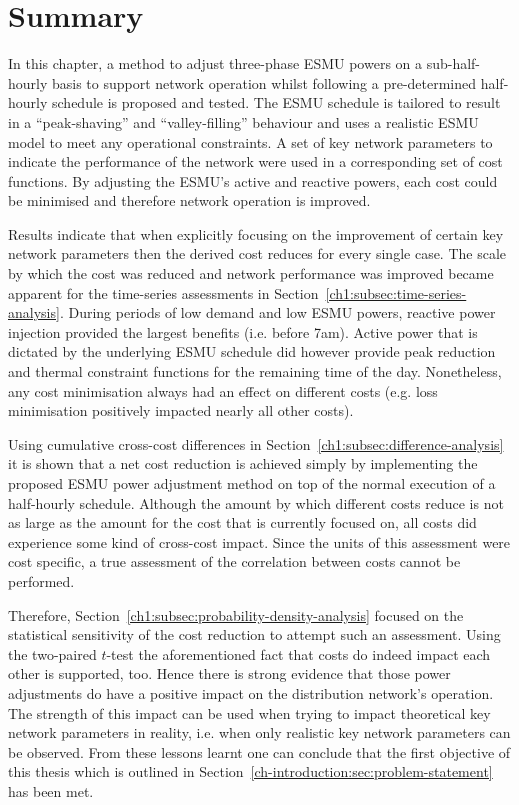 \section{Summary}
\label{ch1:sec:summary}

In this chapter, a method to adjust three-phase ESMU powers on a sub-half-hourly basis to support network operation whilst following a pre-determined half-hourly schedule is proposed and tested.
The ESMU schedule is tailored to result in a ``peak-shaving'' and ``valley-filling'' behaviour and uses a realistic ESMU model to meet any operational constraints.
A set of key network parameters to indicate the performance of the network were used in a corresponding set of cost functions.
By adjusting the ESMU's active and reactive powers, each cost could be minimised and therefore network operation is improved.

Results indicate that when explicitly focusing on the improvement of certain key network parameters then the derived cost reduces for every single case.
The scale by which the cost was reduced and network performance was improved became apparent for the time-series assessments in Section~\ref{ch1:subsec:time-series-analysis}.
During periods of low demand and low ESMU powers, reactive power injection provided the largest benefits (i.e. before 7am).
Active power that is dictated by the underlying ESMU schedule did however provide peak reduction and thermal constraint functions for the remaining time of the day.
Nonetheless, any cost minimisation always had an effect on different costs (e.g. loss minimisation positively impacted nearly all other costs).

Using cumulative cross-cost differences in Section~\ref{ch1:subsec:difference-analysis} it is shown that a net cost reduction is achieved simply by implementing the proposed ESMU power adjustment method on top of the normal execution of a half-hourly schedule.
Although the amount by which different costs reduce is not as large as the amount for the cost that is currently focused on, all costs did experience some kind of cross-cost impact.
Since the units of this assessment were cost specific, a true assessment of the correlation between costs cannot be performed.

Therefore, Section~\ref{ch1:subsec:probability-density-analysis} focused on the statistical sensitivity of the cost reduction to attempt such an assessment.
Using the two-paired $t$-test the aforementioned fact that costs do indeed impact each other is supported, too.
Hence there is strong evidence that those power adjustments do have a positive impact on the distribution network's operation.
The strength of this impact can be used when trying to impact theoretical key network parameters in reality, i.e. when only realistic key network parameters can be observed.
From these lessons learnt one can conclude that the first objective of this thesis which is outlined in Section~\ref{ch-introduction:sec:problem-statement} has been met.

